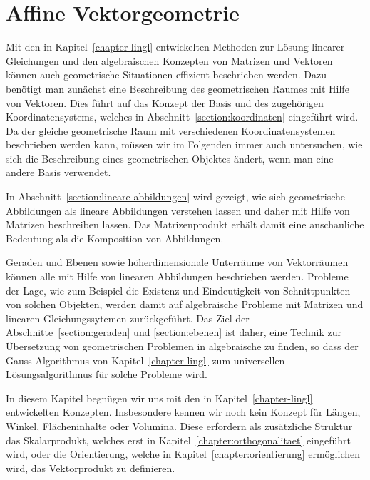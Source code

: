 %
%
%
\chapter{Affine Vektorgeometrie\label{chapter:affin}}
\rhead{}
Mit den in Kapitel~\ref{chapter-lingl} entwickelten Methoden zur Lösung
linearer Gleichungen und den algebraischen Konzepten von Matrizen und Vektoren
können auch geometrische Situationen effizient beschrieben werden.
Dazu benötigt man zunächst eine Beschreibung des geometrischen Raumes
mit Hilfe von Vektoren.
Dies führt auf das Konzept der Basis und des zugehörigen Koordinatensystems,
welches in Abschnitt~\ref{section:koordinaten} eingeführt wird.
Da der gleiche geometrische Raum mit verschiedenen Koordinatensystemen
beschrieben werden kann, müssen wir im Folgenden immer auch untersuchen,
wie sich die Beschreibung eines geometrischen Objektes ändert, wenn man
eine andere Basis verwendet.

In Abschnitt~\ref{section:lineare abbildungen} wird gezeigt, wie sich
geometrische Abbildungen als lineare Abbildungen verstehen lassen und
daher mit Hilfe von Matrizen beschreiben lassen.
Das Matrizenprodukt erhält damit eine anschauliche Bedeutung als die
Komposition von Abbildungen.

Geraden und Ebenen sowie höherdimensionale Unterräume von Vektorräumen
können alle mit Hilfe von linearen Abbildungen beschrieben werden.
Probleme der Lage, wie zum Beispiel die Existenz und Eindeutigkeit von
Schnittpunkten von solchen Objekten, werden damit auf algebraische Probleme
mit Matrizen und linearen Gleichungssytemen zurückgeführt.
Das Ziel der Abschnitte~\ref{section:geraden} und \ref{section:ebenen}
ist daher, eine Technik
zur Übersetzung von geometrischen Problemen in algebraische zu finden,
so dass der Gauss-Algorithmus von Kapitel~\ref{chapter-lingl} zum universellen
Lösungsalgorithmus für solche Probleme wird.

In diesem Kapitel begnügen wir uns mit den in Kapitel~\ref{chapter-lingl}
entwickelten Konzepten.
Insbesondere kennen wir noch kein Konzept für Längen, Winkel,
Flächeninhalte oder Volumina.
Diese erfordern als zusätzliche Struktur das Skalarprodukt, welches erst in
Kapitel~\ref{chapter:orthogonalitaet} eingeführt wird, oder die Orientierung,
welche in Kapitel~\ref{chapter:orientierung} ermöglichen wird,
das Vektorprodukt zu definieren.






